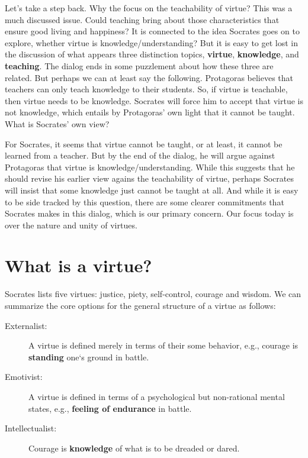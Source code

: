 \documentclass[oneside]{article}
\begin{document}
\noindent Let's take a step back. Why the focus on the teachability of virtue? This was a much discussed issue. Could teaching bring about those characteristics that ensure good living and happiness? It is connected to the idea Socrates goes on to explore, whether virtue is knowledge/understanding? But it is easy to get lost in the discussion of what appears three distinction topics, \textbf{virtue}, \textbf{knowledge}, and \textbf{teaching}. The dialog ends in some puzzlement about how these three are related. But perhaps we can at least say the following. Protagoras believes that teachers can only teach knowledge to their students. So, if virtue is teachable, then virtue needs to be knowledge. Socrates will force him to accept that virtue is not knowledge, which entails by Protagoras' own light that it cannot be taught. What is Socrates' own view? 

For Socrates, it seems that virtue cannot be taught, or at least, it cannot be learned from a teacher. But by the end of the dialog, he will argue against Protagoras that virtue is knowledge/understanding. While this suggests that he should revise his earlier view agains the teachability of virtue, perhaps Socrates will insist that some knowledge just cannot be taught at all. And while it is easy to be side tracked by this question, there are some clearer commitments that Socrates makes in this dialog, which is our primary concern. Our focus today is over the nature and unity of virtues. 

\section*{What is a virtue?}

Socrates lists five virtues: justice, piety, self-control, courage and wisdom. We can summarize the core options for the general structure of a virtue as follows: 

\begin{description}
\item[Externalist:] A virtue is defined merely in terms of their some behavior, e.g., courage is \textbf{standing} one`s ground in battle.
\item[Emotivist:] A virtue is defined in terms of a psychological but non-rational mental states, e.g.,  \textbf{feeling of endurance} in battle.
\item[Intellectualist:] Courage is \textbf{knowledge} of what is to be dreaded or dared.
\end{description}
\end{document}
